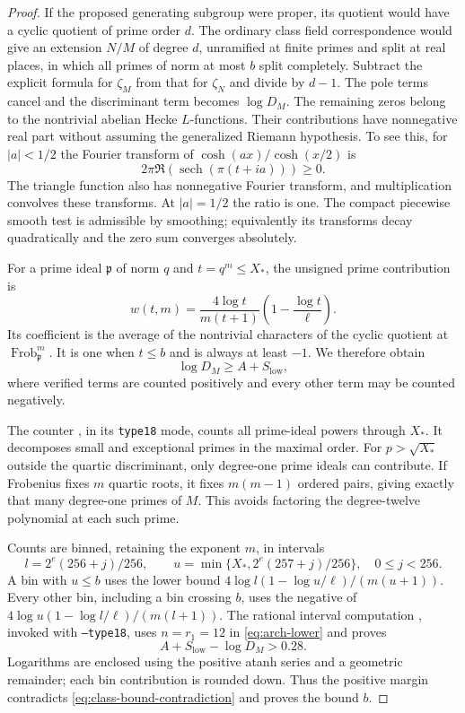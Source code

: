 \begin{proof}
If the proposed generating subgroup were proper, its quotient would
have a cyclic quotient of prime order $d$. The ordinary class field
correspondence would give an extension $N/M$ of degree $d$, unramified
at finite primes and split at real places, in which all primes of norm
at most $b$ split completely. Subtract the explicit formula for
$\zeta_M$ from that for $\zeta_N$ and divide by $d-1$.
The pole terms cancel and the discriminant term becomes $\log D_M$.
The remaining zeros belong to the nontrivial abelian Hecke
$L$-functions. Their contributions have nonnegative real part without
assuming the generalized Riemann hypothesis. To see this, for
$|a|<1/2$ the Fourier transform of $\cosh(ax)/\cosh(x/2)$ is
\[
 2\pi\Re\!\left(\operatorname{sech}(\pi(t+ia))\right)\ge0.
\]
The triangle function also has nonnegative Fourier transform, and
multiplication convolves these transforms. At $|a|=1/2$ the ratio is
one. The compact piecewise smooth test is admissible by smoothing;
equivalently its transforms decay quadratically and the zero sum
converges absolutely.

For a prime ideal $\mathfrak p$ of norm $q$ and $t=q^m\le X_*$, the
unsigned prime contribution is
\[
 w(t,m)=\frac{4\log t}{m(t+1)}\left(1-\frac{\log t}{\ell}\right).
\]
Its coefficient is the average of the nontrivial characters of the
cyclic quotient at $\operatorname{Frob}_{\mathfrak p}^m$. It is one
when $t\le b$ and is always at least $-1$. We therefore obtain
\begin{equation}\label{eq:class-bound-contradiction}
 \log D_M\ge A+S_{\mathrm{low}},
\end{equation}
where verified terms are counted positively and every other term may
be counted negatively.

The counter , in its
\texttt{type18} mode, counts all prime-ideal powers through $X_*$.
It decomposes small and exceptional primes in the maximal order.
For $p>\sqrt{X_*}$ outside the quartic discriminant, only degree-one
prime ideals can contribute. If Frobenius fixes $m$ quartic roots,
it fixes $m(m-1)$ ordered pairs, giving exactly that many degree-one
primes of $M$. This avoids factoring the degree-twelve polynomial at
each such prime.

Counts are binned, retaining the exponent $m$, in intervals
\[
 l=2^e(256+j)/256,\qquad
 u=\min\{X_*,2^e(257+j)/256\},\quad0\le j<256.
\]
A bin with $u\le b$ uses the lower bound
$4\log l(1-\log u/\ell)/(m(u+1))$.
Every other bin, including a bin crossing $b$, uses the negative of
$4\log u(1-\log l/\ell)/(m(l+1))$.
The rational interval computation
, invoked with \texttt{--type18},
uses $n=r_1=12$ in \eqref{eq:arch-lower} and proves
\[
 A+S_{\mathrm{low}}-\log D_M>0.28.
\]
Logarithms are enclosed using the positive atanh series and a geometric
remainder; each bin contribution is rounded down. Thus the positive
margin contradicts \eqref{eq:class-bound-contradiction} and proves the
bound $b$.


\end{proof}
